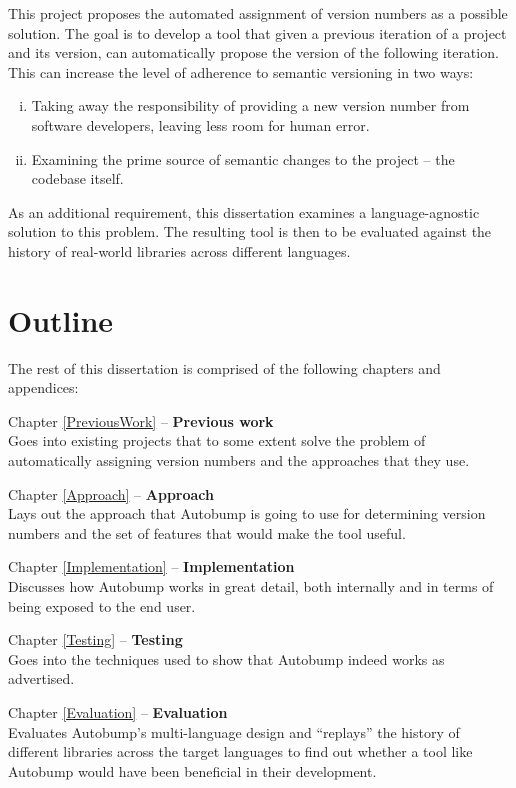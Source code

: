 \documentclass{l4proj}
\begin{document}
This project proposes the automated assignment of version numbers
as a possible solution. The goal is to develop a tool that given a
previous iteration of a project and its version, can automatically
propose the version of the following iteration. This can increase the
level of adherence to semantic versioning in two ways:

\begin{enumerate}[(i)]
\item Taking away the responsibility of providing a new version number
from software developers, leaving less room for human error.
\item Examining the prime source of semantic changes to the project --
the codebase itself.
\end{enumerate}

As an additional requirement, this dissertation examines a
language-agnostic solution to this problem. The resulting tool is then
to be evaluated against the history of real-world libraries across
different languages.

\section{Outline}

The rest of this dissertation is comprised of the following chapters
and appendices:

\noindent Chapter \ref{PreviousWork} -- \textbf{Previous work} \\
Goes into existing projects that to some extent solve the problem
of automatically assigning version numbers and the approaches that
they use.

\noindent Chapter \ref{Approach} -- \textbf{Approach} \\
Lays out the approach that Autobump is going to use for
determining version numbers and the set of features that would make
the tool useful.

\noindent Chapter \ref{Implementation} -- \textbf{Implementation} \\
Discusses how Autobump works in great detail, both internally and
in terms of being exposed to the end user.

\noindent Chapter \ref{Testing} -- \textbf{Testing} \\
Goes into the techniques used to show that Autobump indeed works
as advertised.

\noindent Chapter \ref{Evaluation} -- \textbf{Evaluation} \\
Evaluates Autobump's multi-language design and ``replays'' the history
of different libraries across the target languages to find out whether
a tool like Autobump would have been beneficial in their development.
\end{document}
